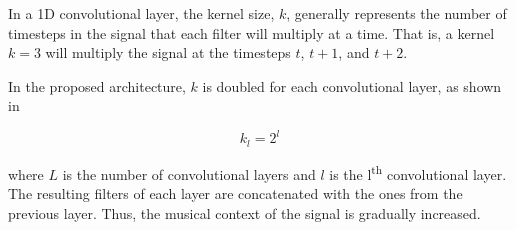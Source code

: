 
In a 1D convolutional layer, the kernel size, $k$, generally
represents the number of timesteps in the signal that each
filter will multiply at a time. That is, a kernel $k=3$ will
multiply the signal at the timesteps $t$, $t+1$, and $t+2$.

In the proposed architecture, $k$ is doubled for each
convolutional layer, as shown in 

\begin{equation}
    \label{eq:kernel_size}
    k_l = 2^{l}
\end{equation}

where $L$ is the number of convolutional layers and $l$ is
the l\textsuperscript{th} convolutional layer. The resulting
filters of each layer are concatenated with the ones from
the previous layer. Thus, the musical context of the signal
is gradually increased.
